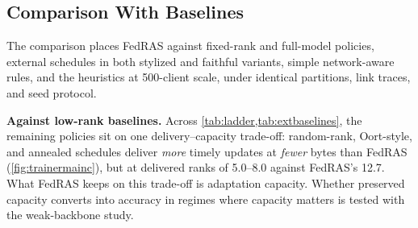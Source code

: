 \documentclass[a4paper,fleqn]{cas-dc}
\begin{document}
\subsection{Comparison With Baselines}
\label{sec:cmp2}
The comparison places FedRAS against fixed-rank and full-model policies, external schedules in both stylized and faithful variants, simple network-aware rules, and the heuristics at 500-client scale, under identical partitions, link traces, and seed protocol.
\par

\par
\textbf{Against low-rank baselines.} Across \cref{tab:ladder,tab:extbaselines}, the remaining policies sit on one delivery--capacity trade-off: random-rank, Oort-style, and annealed schedules deliver \emph{more} timely updates at \emph{fewer} bytes than FedRAS (\cref{fig:trainermainc}), but at delivered ranks of 5.0--8.0 against FedRAS's 12.7. What FedRAS keeps on this trade-off is adaptation capacity. Whether preserved capacity converts into accuracy in regimes where capacity matters is tested with the weak-backbone study.
\end{document}
